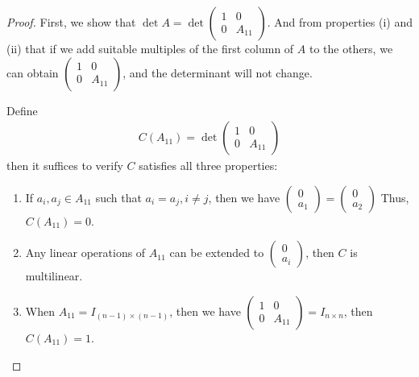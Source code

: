 \documentclass[11pt]{book}
\theoremstyle{definition}
\numberwithin{equation}{subsection}
\begin{document}
\begin{proof}
First, we show that $\det A =\det \left(
    \begin{matrix}
        1 & 0\\
        0 & A_{11}
    \end{matrix}
    \right)$. And from properties (i) and (ii) that if we add suitable multiples of the first column of $A$ to the others, we can obtain $\left(
    \begin{matrix}
        1 & 0\\
        0 & A_{11}
    \end{matrix}
    \right)$, and the determinant will not change.

Define 
\begin{align*}
    C(A_{11}) = \det \left(
    \begin{matrix}
        1 & 0\\
        0 & A_{11}
    \end{matrix}
    \right)
\end{align*}
then it suffices to verify $C$ satisfies all three properties:
\begin{enumerate}[label=(\arabic*)]
    \item If $a_i, a_j\in A_{11}$ such that $a_i = a_j, i\neq j$, then we have $\left(
    \begin{matrix}
        0\\
        a_1
    \end{matrix}
    \right) = \left(
    \begin{matrix}
        0\\
        a_2
    \end{matrix}
    \right)$ Thus, $C(A_{11}) = 0$.
    \item Any linear operations of $A_{11}$ can be extended to $\left(
    \begin{matrix}
        0\\
        a_i
    \end{matrix}
    \right)$, then $C$ is multilinear.
    \item When $A_{11} = I_{(n-1)\times(n-1)}$, then we have $\left(
    \begin{matrix}
        1 & 0\\
        0 & A_{11}
    \end{matrix}
    \right) = I_{n\times n}$, then $C(A_{11}) = 1$.
\end{enumerate}
\end{proof}
\end{document}

